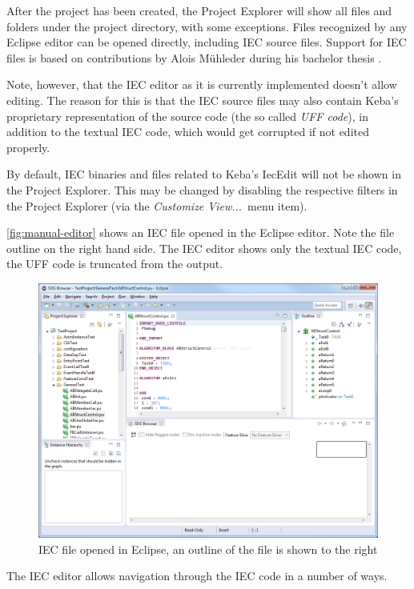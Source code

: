 After the project has been created, the Project Explorer will show all files and folders under the project directory, 
with some exceptions. Files recognized by any Eclipse editor can be opened directly, including IEC source files. 
Support for IEC files is based on contributions by Alois Mühleder during his bachelor thesis \cite{MuehlederBA}.

Note, however, that the IEC editor as it is currently implemented doesn't allow editing. The reason for this is that 
the IEC source files may also contain Keba's proprietary representation of the source code (the so called \emph{UFF 
code}), in addition to the textual IEC code, which would get corrupted if not edited properly.

By default, IEC binaries and files related to Keba's IecEdit will not be shown in the Project Explorer. This may be 
changed by disabling the respective filters in the Project Explorer (via the \emph{Customize View...}\ menu item).

\autoref{fig:manual-editor} shows an IEC file opened in the Eclipse editor. Note the file outline on the right hand 
side. The IEC editor shows only the textual IEC code, the UFF code is truncated from the output.

\begin{figure}[hpb]
  \centering
    \includegraphics[width=\textwidth]{bilder/manual-editor}
  \caption{IEC file opened in Eclipse, an outline of the file is shown to the right}
  \label{fig:manual-editor}
\end{figure}

The IEC editor allows navigation through the IEC code in a number of ways.

